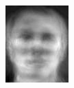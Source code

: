 \begin{frame}
\begin{columns}
\begin{overlayarea}{\textwidth}{\textheight}
{\begin{minipage}[t]{0.15\textwidth}
          \includegraphics[width=\textwidth]{images/eig_docked_image/eig_3.jpeg}
        \end{minipage}
        \begin{minipage}[t]{0.15\textwidth}

\end{minipage}}
\end{overlayarea}
\end{columns}
\end{frame}
